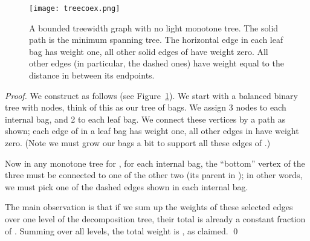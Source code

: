 \documentclass{llncs}
\begin{document}
\begin{figure}[ht]
\begin{center}
{\texttt{[image: treecoex.png]}}
\caption{A bounded treewidth graph with no light monotone tree. 
The solid path  is the minimum spanning tree. The horizontal edge
in each leaf bag has weight one, all other solid edges of  have
weight zero.  All other edges (in particular, the dashed ones) have
weight equal to the distance in  between its endpoints.}
\label{fig:treeex}
\end{center}
\end{figure}
\begin{proof}
We construct  as follows (see Figure~\ref{fig:treeex}).   We start
with a balanced binary tree with  nodes, think of this as our tree
of bags.  We assign 3 nodes to each internal bag, and 2 to each leaf bag.  
We connect these vertices by a path  as shown; each edge of  in a leaf
bag has weight one, all other edges in  have weight zero.  (Note 
we must grow our bags a bit to support all these edges of .)

Now in any monotone tree  for , for each internal bag, the
``bottom'' vertex of the three must be connected to one of the
other two (its parent in ); in other words, we must pick one of the
dashed edges shown in each internal bag.

The main observation is that if we sum up the weights of these
selected edges over one level of the decomposition tree, their total
is already a constant fraction of .  Summing over all levels,
the total weight  is , as claimed.
\qed
\end{proof}






\end{document}
